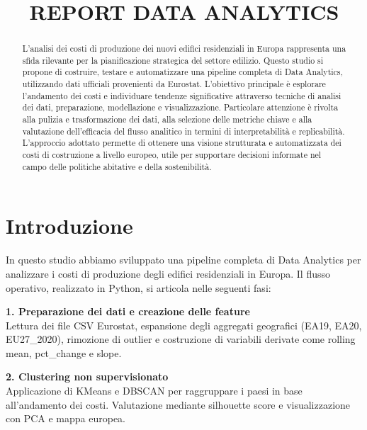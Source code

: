 \documentclass[conference]{IEEEtran}
\begin{document}
\title{REPORT DATA ANALYTICS\\}

\author{}

\maketitle
\begin{abstract}
    L’analisi dei costi di produzione dei nuovi edifici residenziali in Europa rappresenta una sfida rilevante per la pianificazione strategica del settore edilizio. Questo studio si propone di costruire, testare e automatizzare una pipeline completa di Data Analytics, utilizzando dati ufficiali provenienti da Eurostat. L’obiettivo principale è esplorare l’andamento dei costi e individuare tendenze significative attraverso tecniche di analisi dei dati, preparazione, modellazione e visualizzazione. Particolare attenzione è rivolta alla pulizia e trasformazione dei dati, alla selezione delle metriche chiave e alla valutazione dell’efficacia del flusso analitico in termini di interpretabilità e replicabilità. L’approccio adottato permette di ottenere una visione strutturata e automatizzata dei costi di costruzione a livello europeo, utile per supportare decisioni informate nel campo delle politiche abitative e della sostenibilità.
\end{abstract}

\section*{\LARGE\textbf{Introduzione}}

In questo studio abbiamo sviluppato una pipeline completa di Data Analytics per analizzare i costi di produzione degli edifici residenziali in Europa. Il flusso operativo, realizzato in Python, si articola nelle seguenti fasi:

\vspace{1em}

{\large \textbf{1. Preparazione dei dati e creazione delle feature}}\\
{\small Lettura dei file CSV Eurostat, espansione degli aggregati geografici (EA19, EA20, EU27\_2020), rimozione di outlier e costruzione di variabili derivate come rolling mean, pct\_change e slope.}

\vspace{1em}

{\large \textbf{2. Clustering non supervisionato}}\\
{\small Applicazione di KMeans e DBSCAN per raggruppare i paesi in base all’andamento dei costi. Valutazione mediante silhouette score e visualizzazione con PCA e mappa europea.}
\end{document}
